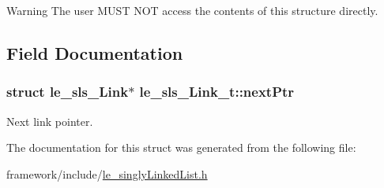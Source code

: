 \begin{DoxyWarning}{Warning}
The user M\+U\+ST N\+OT access the contents of this structure directly. 
\end{DoxyWarning}


\subsection{Field Documentation}
\subsubsection[{\texorpdfstring{next\+Ptr}{nextPtr}}]{\setlength{\rightskip}{0pt plus 5cm}struct le\+\_\+sls\+\_\+\+Link$\ast$ le\+\_\+sls\+\_\+\+Link\+\_\+t\+::next\+Ptr}\hypertarget{structle__sls___link__t_ab3b10ba398661c42032ece7720860ee2}{}\label{structle__sls___link__t_ab3b10ba398661c42032ece7720860ee2}


Next link pointer. 



The documentation for this struct was generated from the following file\+:\begin{DoxyCompactItemize}
\item 
framework/include/\hyperlink{le__singly_linked_list_8h}{le\+\_\+singly\+Linked\+List.\+h}\end{DoxyCompactItemize}
